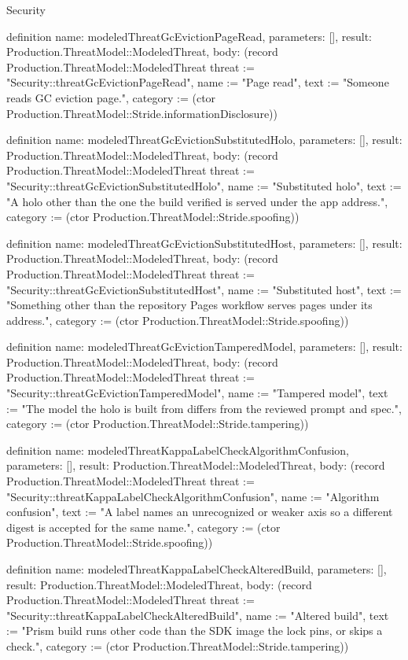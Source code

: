 \begin{lexlean}{Security}
\begin{semanticmodule}
definition{
  name: modeledThreatGcEvictionPageRead,
  parameters: [],
  result: Production.ThreatModel::ModeledThreat,
  body: (record Production.ThreatModel::ModeledThreat {threat := "Security::threatGcEvictionPageRead", name := "Page read", text := "Someone reads GC eviction page.", category := (ctor Production.ThreatModel::Stride.informationDisclosure)})
}

definition{
  name: modeledThreatGcEvictionSubstitutedHolo,
  parameters: [],
  result: Production.ThreatModel::ModeledThreat,
  body: (record Production.ThreatModel::ModeledThreat {threat := "Security::threatGcEvictionSubstitutedHolo", name := "Substituted holo", text := "A holo other than the one the build verified is served under the app address.", category := (ctor Production.ThreatModel::Stride.spoofing)})
}

definition{
  name: modeledThreatGcEvictionSubstitutedHost,
  parameters: [],
  result: Production.ThreatModel::ModeledThreat,
  body: (record Production.ThreatModel::ModeledThreat {threat := "Security::threatGcEvictionSubstitutedHost", name := "Substituted host", text := "Something other than the repository Pages workflow serves pages under its address.", category := (ctor Production.ThreatModel::Stride.spoofing)})
}

definition{
  name: modeledThreatGcEvictionTamperedModel,
  parameters: [],
  result: Production.ThreatModel::ModeledThreat,
  body: (record Production.ThreatModel::ModeledThreat {threat := "Security::threatGcEvictionTamperedModel", name := "Tampered model", text := "The model the holo is built from differs from the reviewed prompt and spec.", category := (ctor Production.ThreatModel::Stride.tampering)})
}

definition{
  name: modeledThreatKappaLabelCheckAlgorithmConfusion,
  parameters: [],
  result: Production.ThreatModel::ModeledThreat,
  body: (record Production.ThreatModel::ModeledThreat {threat := "Security::threatKappaLabelCheckAlgorithmConfusion", name := "Algorithm confusion", text := "A label names an unrecognized or weaker axis so a different digest is accepted for the same name.", category := (ctor Production.ThreatModel::Stride.spoofing)})
}

definition{
  name: modeledThreatKappaLabelCheckAlteredBuild,
  parameters: [],
  result: Production.ThreatModel::ModeledThreat,
  body: (record Production.ThreatModel::ModeledThreat {threat := "Security::threatKappaLabelCheckAlteredBuild", name := "Altered build", text := "Prism build runs other code than the SDK image the lock pins, or skips a check.", category := (ctor Production.ThreatModel::Stride.tampering)})
}


\end{semanticmodule}
\end{lexlean}

